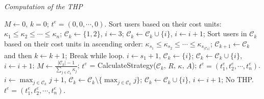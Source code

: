 \documentclass{IEEEtran}
\begin{document}
\begin{algorithm}[!t]
\begin{small}
\caption{\emph{Computation of the THP}}
\label{alg:THP}
\renewcommand{\algorithmicrequire}{\textbf{Input:}}
\renewcommand{\algorithmicensure}{\textbf{Output:}}
\begin{algorithmic}[1]
\State $M \leftarrow 0$, $k=0$;
	\Return $t^{e}=(0,0,\cdots,0)$.
\EndIf
\State Sort users based on their cost units: $\kappa_1 \leq \kappa_2 \leq \cdots \leq \kappa_n$;
\State $\mathcal{C}_k \leftarrow \{1,2\}$, $i \leftarrow 3$;
	\State $\mathcal{C}_k \leftarrow \mathcal{C}_k \cup \{i\}$, $i \leftarrow i+1$;
\EndWhile
{}
\State Sort users in $\mathcal{C}_k$ based on their cost units in ascending order: $\kappa_{s_1} \leq \kappa_{s_2} \leq \cdots \leq \kappa_{s_{|\mathcal{C}_k|}}$;
\State $\mathcal{C}_{k+1}\leftarrow \mathcal{C}_k$ and then $k\gets k+1$;
	\State Break while loop.
\EndIf
{}
	\State $i \leftarrow s_1+1$, $\mathcal{C}_k \leftarrow \{i\}$;
		\State $\mathcal{C}_k \leftarrow \mathcal{C}_k\cup \{i\}$, $i\leftarrow i+1$;
	\EndWhile
\EndIf
{}
			\State $M \leftarrow \frac{|\mathcal{C}_k|-1}{\sum_{j\in\mathcal{C}_k}\kappa_j}$;
			\State $t^e$ = \textsf{CalculateStrategy}($\mathcal{C}_k$, $R$, $\kappa$, $A$);
				 $t^{e}=(t_1^{e},t_2^{e},\cdots,t_n^{e})$.
			\EndIf
		\EndIf
	\EndIf
	\State $i \leftarrow \max_{j\in\mathcal{C}_k}j+1$, $\mathcal{C}_k\leftarrow\mathcal{C}_k\setminus\{\max_{j\in\mathcal{C}_k}j\}$;
		\State $\mathcal{C}_k\leftarrow\mathcal{C}_k\cup\{i\}$, $i \leftarrow i+1$;
	\EndWhile
\EndIf
\EndWhile
	 No THP.
\Else
	 $t^{e}=(t_1^{e},t_2^{e},\cdots,t_n^{e})$.
\EndIf


\end{algorithmic}
\end{small}
\end{algorithm}
\end{document}
